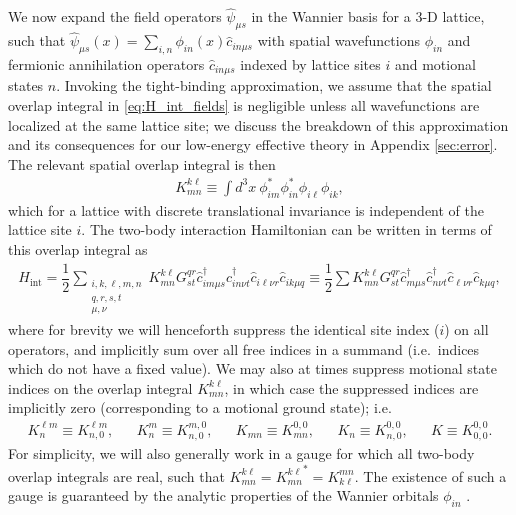 \documentclass[preprint,showkeys,nofootinbib]{revtex4-1}
\renewcommand{\t}{\text} %
\newcommand{\f}{\dfrac} %
\renewcommand{\c}{\hat{c}}
\newcommand{\1}{\mathds{1}}
\begin{document}
We now expand the field operators $\hat\psi_{\mu s}$ in the Wannier
basis for a 3-D lattice, such that
$\hat\psi_{\mu s}(x) = \sum_{i,n} \phi_{in}(x) \c_{in\mu s}$ with
spatial wavefunctions $\phi_{in}$ and fermionic annihilation operators
$\c_{in\mu s}$ indexed by lattice sites $i$ and motional states $n$.
Invoking the tight-binding approximation, we assume that the spatial
overlap integral in \eqref{eq:H_int_fields} is negligible unless all
wavefunctions are localized at the same lattice site; we discuss the
breakdown of this approximation and its consequences for our
low-energy effective theory in Appendix \ref{sec:error}.  The relevant
spatial overlap integral is then
\begin{align}
  K^{k\ell}_{mn}
  \equiv \int d^3x~ \phi_{im}^* \phi_{in}^* \phi_{i\ell} \phi_{ik},
  \label{eq:K_klmn}
\end{align}
which for a lattice with discrete translational invariance is
independent of the lattice site $i$.  The two-body interaction
Hamiltonian can be written in terms of this overlap integral as
\begin{align}
  H_{\t{int}}
  = \f12 \sum_{\substack{i,k,\ell,m,n\\q,r,s,t\\\mu,\nu}}
  K^{k\ell}_{mn} G^{qr}_{st}
  \c_{im\mu s}^\dag \c_{in\nu t}^\dag \c_{i\ell\nu r} \c_{ik\mu q}
  \equiv \f12 \sum K^{k\ell}_{mn} G^{qr}_{st}
  \c_{m\mu s}^\dag \c_{n\nu t}^\dag \c_{\ell\nu r} \c_{k\mu q},
  \label{eq:H_int}
\end{align}
where for brevity we will henceforth suppress the identical site index
($i$) on all operators, and implicitly sum over all free indices in a
summand (i.e.~indices which do not have a fixed value).  We may also
at times suppress motional state indices on the overlap integral
$K^{k\ell}_{mn}$, in which case the suppressed indices are implicitly
zero (corresponding to a motional ground state); i.e.
\begin{align}
  K^{\ell m}_n \equiv K^{\ell m}_{n,0},
  &&
  K^m_n \equiv K^{m,0}_{n,0},
  &&
  K_{mn} \equiv K^{0,0}_{mn},
  &&
  K_n \equiv K^{0,0}_{n,0},
  &&
  K \equiv K^{0,0}_{0,0}.
  \label{eq:K}
\end{align}
For simplicity, we will also generally work in a gauge for which all
two-body overlap integrals are real, such that
$K^{k\ell}_{mn}={K^{k\ell}_{mn}}^*=K^{mn}_{k\ell}$.  The existence of
such a gauge is guaranteed by the analytic properties of the Wannier
orbitals $\phi_{in}$ \cite{kohn1959analytic}.
\end{document}
